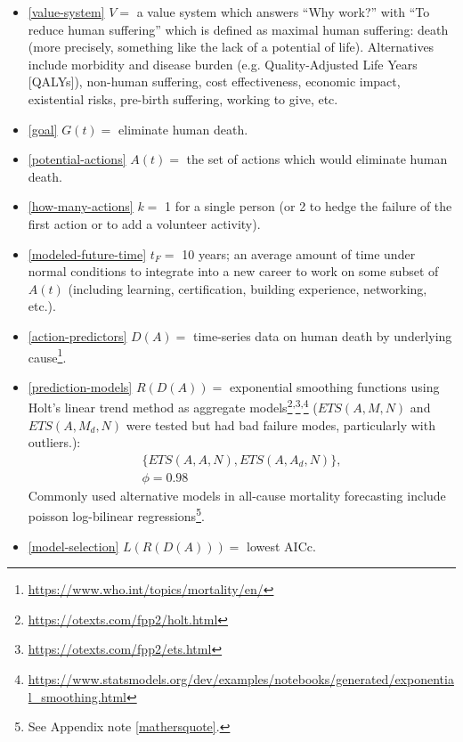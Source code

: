 \documentclass[10pt, a4paper, twocolumn]{IEEEconf}
\begin{document}
\begin{itemize}
  \item \eqref{value-system} $V = $ a value system which answers \enquote{Why work?} with \enquote{To reduce human suffering} which is defined as maximal human suffering: death (more precisely, something like the lack of a potential of life).
  Alternatives include morbidity and disease burden (e.g. Quality-Adjusted Life Years [QALYs]\cite{weinstein2009qalys,lopez2006global}), non-human suffering, cost effectiveness\cite{jamison2017disease,neumann2018comparing,givewellcosteffectiveness}, economic impact\cite{world2009guide}, existential risks\cite{bostrom2013existential}, pre-birth suffering, working to give\cite{macaskill2015doing}, etc.
  \item \eqref{goal} $G(t) = $ eliminate human death.
  \item \eqref{potential-actions} $A(t) = $ the set of actions which would eliminate human death.
  \item \eqref{how-many-actions} $k = $ 1 for a single person (or 2 to hedge the failure of the first action or to add a volunteer activity).
  \item \eqref{modeled-future-time} $t_F = $ 10 years; an average amount of time under normal conditions to integrate into a new career to work on some subset of $A(t)$ (including learning, certification, building experience, networking, etc.).
  \item \eqref{action-predictors} $D(A) = $ time-series data on human death by underlying cause\footnote{\scriptsize{\url{https://www.who.int/topics/mortality/en/}}}.
  \item \eqref{prediction-models} $R(D(A)) = $ exponential smoothing functions using Holt's linear trend method as aggregate models\footnote{\scriptsize{\url{https://otexts.com/fpp2/holt.html}}}\textsuperscript{,}\footnote{\scriptsize{\url{https://otexts.com/fpp2/ets.html}}}\textsuperscript{,}\footnote{\scriptsize{\url{https://www.statsmodels.org/dev/examples/notebooks/generated/exponential_smoothing.html}}} ($ETS(A,M,N)$ and $ETS(A,M_d,N)$ were tested but had bad failure modes, particularly with outliers.):
    \begin{equation*}
      \begin{gathered}
        \{ETS(A,A,N),ETS(A,A_d,N)\},\\
        \phi=0.98
      \end{gathered}
    \end{equation*}
    Commonly used alternative models in all-cause mortality forecasting include poisson log-bilinear regressions\footnote{See Appendix note \ref{mathersquote}.}.
  \item \eqref{model-selection} $L(R(D(A))) = $ lowest AICc.
\end{itemize}
\end{document}
